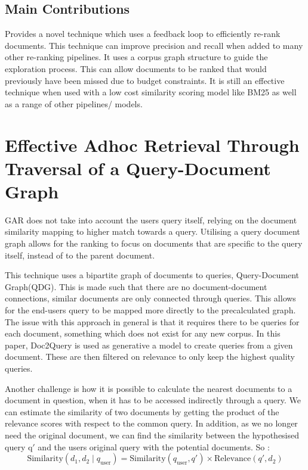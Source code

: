 \documentclass[sigconf,authorversion,nonacm]{acmart}
\begin{document}
\subsection{Main Contributions}

Provides a novel technique which uses a feedback loop to efficiently re-rank documents. This
technique can improve precision and recall when added to many other re-ranking pipelines. It uses a
corpus graph structure to guide the exploration process. This can allow documents to be ranked that
would previously have been missed due to budget constraints. It is still an effective technique when
used with a low cost similarity scoring model like BM25 as well as a range of other pipelines/
models.

\section{Effective Adhoc Retrieval Through Traversal of a Query-Document Graph}

GAR\cite{gar} does not take into account the users query itself, relying on the document similarity mapping to
higher match towards a query. Utilising a query document graph allows for the ranking to focus on
documents that are specific to the query itself, instead of to the parent document.

This technique uses a bipartite graph of documents to queries, Query-Document
Graph(QDG)\cite{query-document}. This is made such that there are no document-document connections,
similar documents are only connected through queries. This allows for the end-users query to be
mapped more directly to the precalculated graph. The issue with this approach in general is that it
requires there to be queries for each document, something which does not exist for any new corpus.
In this paper, Doc2Query\cite{doc2query} is used as generative a model to create queries from a given document.
These are then filtered on relevance to only keep the highest quality queries.

Another challenge is how it is possible to calculate the nearest documents to a document in
question, when it has to be accessed indirectly through a query. We can estimate the similarity
of two documents by getting the product of the relevance scores with respect to the common query. In
addition, as we no longer need the original document, we can find the similarity between the
hypothesised query q\('\) and the users original query with the potential documents.
So :
\[
	\text{Similarity}(d_1, d_2 \mid q_{\text{user}}) = \text{Similarity}(q_{\text{user}}, q') \times
	\text{Relevance}(q', d_2)
\]
\end{document}
